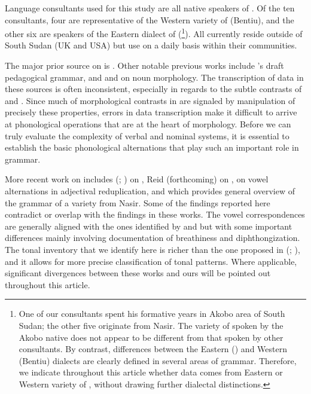 \documentclass[output=paper,newtxmath,modfonts,nonflat]{langsci/langscibook}
\begin{document}
Language consultants used for this study are all native speakers of . Of the ten consultants, four are representative of the Western variety of  (Bentiu), and the other six are speakers of the Eastern dialect of  (\footnote{One of our   consultants spent his formative years in Akobo area of South Sudan; the other five originate from Nasir. The variety of  spoken by the Akobo native does not appear to be different from that spoken by other   consultants. By contrast, differences between the Eastern () and Western (Bentiu) dialects are clearly defined in several areas of grammar. Therefore, we indicate throughout this article whether data comes from Eastern or Western variety of , without drawing further dialectal distinctions.}). All currently reside outside of South Sudan (UK and USA) but use  on a daily basis within their communities. 

The major prior source on  is \citet{Crazzolara1933}. Other notable previous works include \citet{Vandevortnd}'s draft pedagogical grammar, and \citet{Frank1999} and \citet{Storch2005} on noun morphology. The transcription of data in these sources is often inconsistent, especially in regards to the subtle contrasts of  and . Since much of morphological contrasts in  are signaled by manipulation of precisely these properties, errors in data transcription make it difficult to arrive at phonological operations that are at the heart of  morphology. Before we can truly evaluate the complexity of  verbal and nominal systems, it is essential to establish the basic phonological alternations that play such an important role in  grammar.

More recent work on  includes
\citeauthor{gjersøe2016} (\citeyear{gjersøe2016}; \citeyear{gjersøe2017}) on , Reid (forthcoming) on , \citet{Faust2017} on vowel alternations in adjectival reduplication, and \citet{faust2015} which provides general overview of the grammar of a  variety from Nasir. Some of the findings reported here contradict or overlap with the findings in these works. The vowel correspondences are generally aligned with the ones identified by \citet{Faust2017} and \citet{faust2015} but with some important differences mainly involving documentation of breathiness and diphthongization. The tonal inventory that we identify here is richer than the one proposed in \citeauthor{gjersøe2016} (\citeyear{gjersøe2016}; \citeyear{gjersøe2017}), and it allows for more precise classification of tonal patterns. Where applicable, significant divergences between these works and ours will be pointed out throughout this article.
\end{document}
